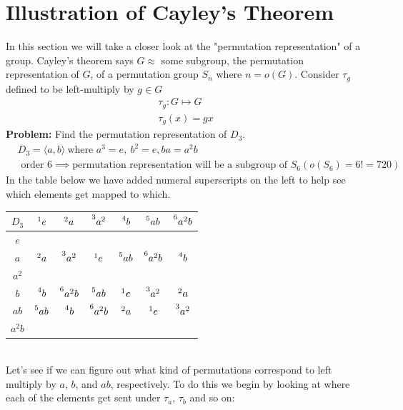 \section*{Illustration of Cayley's Theorem}
In this section we will take a closer look at the "permutation representation" of a group. Cayley's theorem says $G\approx$ some subgroup, the permutation representation of $G$, of a permutation group $S_n$ where $n=o(G)$. Consider $\tau_g$ defined to be left-multiply by $g\in G$
\begin{align}
    \tau_g : G\mapsto G \nonumber \\
    \tau_g(x) = gx \nonumber
\end{align}
\textbf{Problem:} Find the permutation representation of $D_3$.
\begin{align}
    &D_3 = \langle a,b \rangle \ \text{where } a^3=e, \ b^2 = e, ba=a^2b \nonumber \\
    &\text{ order }6 \implies \text{permutation representation will be a subgroup of }S_6 (o(S_6)=6!=720) \nonumber
\end{align}
In the table below we have added numeral superscripts on the left to help see which elements get mapped to which.
\begin{table}[h!]
    \centering
    \begin{tabular}{c|c|c|c|c|c|c|}
          $D_3$& $\prescript{1}{}{e}$&$\prescript{2}{}{a}$&$\prescript{3}{}{a^2}$&$\prescript{4}{}{b}$&$\prescript{5}{}{ab}$&$\prescript{6}{}{a^2b}$ \\ \hline 
          $e$&&&&&& \\ \hline
          $a$&$\prescript{2}{}{a}$&$\prescript{3}{}{a^2}$&$\prescript{1}{}{e}$&$\prescript{5}{}{ab}$&$\prescript{6}{}{a^2b}$&$\prescript{4}{}{b}$ \\ \hline
          $a^2$&&&&&& \\ \hline
          $b$&$\prescript{4}{}{b}$&$\prescript{6}{}{a^2b}$&$\prescript{5}{}{ab}$&$\prescript{1}{}{e}$&$\prescript{3}{}{a^2}$&$\prescript{2}{}{a}$ \\ \hline
          $ab$&$\prescript{5}{}{ab}$&$\prescript{4}{}{b}$&$\prescript{6}{}{a^2b}$&$\prescript{2}{}{a}$&$\prescript{1}{}{e}$&$\prescript{3}{}{a^2}$ \\ \hline
          $a^2b$&&&&&& \\ \hline 
    \end{tabular}
    \label{tab:D_3_Partial_Cayley_Table}
\end{table}\\
Let's see if we can figure out what kind of permutations correspond to left multiply by $a$, $b$, and $ab$, respectively. To do this we begin by looking at where each of the elements get sent under $\tau_a$, $\tau_b$ and so on:
